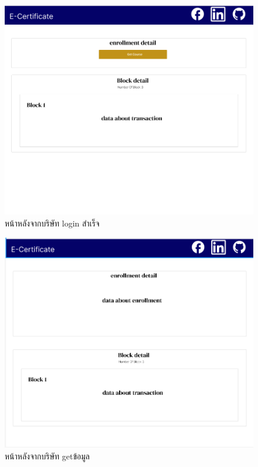 \graphicspath{ {./images/} }
\begin{figure}[htbp]
  \centering 
  \includegraphics[scale=0.5]{company.png}
  \caption[Peers Diagram 5]{หน้าหลังจากบริษัท login สำเร็จ}
  \label{fig:company}
\end{figure}

\graphicspath{ {./images/} }
\begin{figure}[htbp]
  \centering 
  \includegraphics[scale=0.5]{comda.png}
  \caption[Peers Diagram 5]{หน้าหลังจากบริษัท getข้อมูล}
  \label{fig:getdata}
\end{figure}

